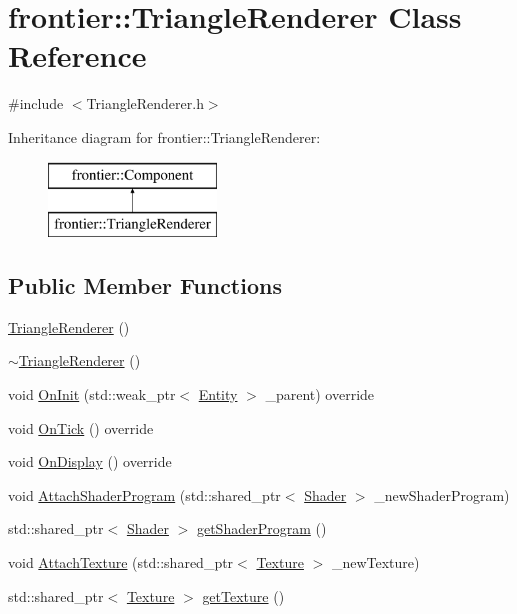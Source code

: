 \hypertarget{classfrontier_1_1_triangle_renderer}{}\section{frontier\+:\+:Triangle\+Renderer Class Reference}
\label{classfrontier_1_1_triangle_renderer}


{\ttfamily \#include $<$Triangle\+Renderer.\+h$>$}

Inheritance diagram for frontier\+:\+:Triangle\+Renderer\+:\begin{figure}[H]
\begin{center}
\leavevmode
\includegraphics[height=2.000000cm]{classfrontier_1_1_triangle_renderer}
\end{center}
\end{figure}
\subsection*{Public Member Functions}
\begin{DoxyCompactItemize}
\item 
\hyperlink{classfrontier_1_1_triangle_renderer_a6ee0c85620ddc77a1c4275a00f9c28cf}{Triangle\+Renderer} ()
\item 
\hyperlink{classfrontier_1_1_triangle_renderer_a3916e1bbdb4bdfe4b4d6c93f7042a552}{$\sim$\+Triangle\+Renderer} ()
\item 
void \hyperlink{classfrontier_1_1_triangle_renderer_af67946b8641608198ae92548b7c002b5}{On\+Init} (std\+::weak\+\_\+ptr$<$ \hyperlink{classfrontier_1_1_entity}{Entity} $>$ \+\_\+parent) override
\item 
void \hyperlink{classfrontier_1_1_triangle_renderer_a1db716057c1fcc2c10500958a732963b}{On\+Tick} () override
\item 
void \hyperlink{classfrontier_1_1_triangle_renderer_a2c899b9897b149dd1c7d351c11b53272}{On\+Display} () override
\item 
void \hyperlink{classfrontier_1_1_triangle_renderer_abcfffb9fa9881768899ff231be4f936f}{Attach\+Shader\+Program} (std\+::shared\+\_\+ptr$<$ \hyperlink{classfrontier_1_1_shader}{Shader} $>$ \+\_\+new\+Shader\+Program)
\item 
std\+::shared\+\_\+ptr$<$ \hyperlink{classfrontier_1_1_shader}{Shader} $>$ \hyperlink{classfrontier_1_1_triangle_renderer_a3645cd255e151c90480903d8c5907aac}{get\+Shader\+Program} ()
\item 
void \hyperlink{classfrontier_1_1_triangle_renderer_ab8cee7fc9eb0fcb70f40a646424aff96}{Attach\+Texture} (std\+::shared\+\_\+ptr$<$ \hyperlink{classfrontier_1_1_texture}{Texture} $>$ \+\_\+new\+Texture)
\item 
std\+::shared\+\_\+ptr$<$ \hyperlink{classfrontier_1_1_texture}{Texture} $>$ \hyperlink{classfrontier_1_1_triangle_renderer_adafa2024a2d486d2abf15dda2d202344}{get\+Texture} ()
\end{DoxyCompactItemize}
